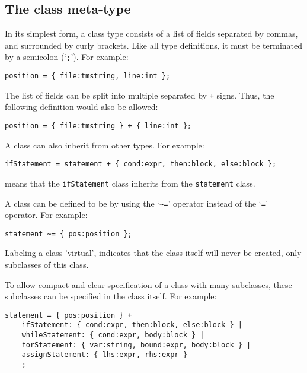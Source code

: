 \subsection{The class meta-type}
In its simplest form, a class type consists of a list of fields separated
by commas, and surrounded by curly brackets.
Like all type definitions, it must be terminated by a semicolon (`\verb';'').
For example:
\begin{showfile}
\begin{verbatim}
position = { file:tmstring, line:int };
\end{verbatim}
\end{showfile}
The list of fields can be split into multiple  separated
by \verb'+' signs. Thus, the following definition would also be allowed:
\begin{showfile}
\begin{verbatim}
position = { file:tmstring } + { line:int };
\end{verbatim}
\end{showfile}
A class can also inherit from other types. 
For example:
\begin{showfile}
\begin{verbatim}
ifStatement = statement + { cond:expr, then:block, else:block };
\end{verbatim}
\end{showfile}
means that the {\tt ifStatement} class inherits from the {\tt statement}
class.
\par
A class can be defined to be  by using the `\verb'~=''
operator instead of the `\verb'='' operator. For example:
\begin{showfile}
\begin{verbatim}
statement ~= { pos:position };
\end{verbatim}
\end{showfile}
Labeling a class 'virtual', indicates that the class itself will
never be created, only subclasses of this class.
\par
To allow compact and clear specification of a class with many
subclasses, these subclasses can be specified in the class itself.
For example:
\begin{showfile}
\begin{verbatim}
statement = { pos:position } +
    ifStatement: { cond:expr, then:block, else:block } |
    whileStatement: { cond:expr, body:block } |
    forStatement: { var:string, bound:expr, body:block } |
    assignStatement: { lhs:expr, rhs:expr }
    ;
\end{verbatim}
\end{showfile}
